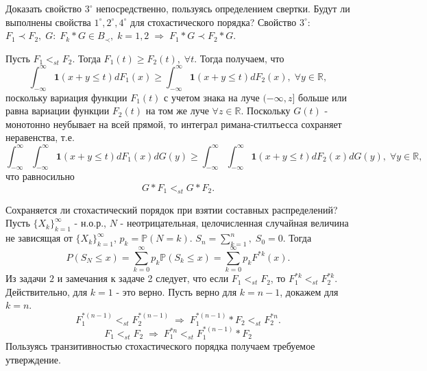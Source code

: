     \problem{}
        Доказать свойство $3^\circ$ непосредственно, пользуясь определением свертки. Будут ли выполнены свойства $1^\circ,2^\circ,4^\circ$ для стохастического порядка?
        \solution{}
            Свойство $3^\circ$: $F_1 \prec F_2, \; G: \; F_k*G \in B_{\prec},\; k=1,2 \; \Rightarrow \; F_1*G \prec F_2*G $.
                
            Пусть $F_1 <_{st} F_2$. Тогда $F_1(t) \geq F_2(t), \; \forall t  $. Тогда получаем, что 
            \begin{equation*}
                \int_{-\infty}^{\infty} \textbf{1}(x+y\leq t) dF_1(x) \geq \int_{-\infty}^{\infty} \textbf{1}(x+y\leq t) dF_2(x) , \; \forall y \in \mathbb R,
            \end{equation*}
            поскольку вариация функции $F_1(t)$ с учетом знака на луче $(-\infty, z]$ больше или равна вариации функции $F_2(t)$ на том же луче $\forall z \in \mathbb R$.
            Поскольку $G(t)$ - монотонно неубывает на всей прямой, то интеграл римана-стилтьесса сохраняет неравенства, т.е. 
            \begin{equation*}
                \int_{-\infty}^{\infty}\int_{-\infty}^{\infty} \textbf{1}(x+y\leq t) dF_1(x)dG(y) \geq \int_{-\infty}^{\infty}\int_{-\infty}^{\infty} \textbf{1}(x+y\leq t) dF_2(x)dG(y) , \; \forall y \in \mathbb R,
            \end{equation*}
            что равносильно 
            \begin{equation*}
                G*F_1 <_{st} G*F_2.
            \end{equation*}
    
    \problem{}
        Сохраняется ли стохастический порядок при взятии составных распределений?
        \solution{}
        Пусть $\{X_k\}_{k=1}^\infty$ - н.о.р., $N$ - неотрицательная, целочисленная случайная величина не зависящая от $\{X_k\}_{k=1}^\infty$, $p_k = \mathbb P(N=k)$. $S_n = \sum_{k=1}^n ,\; S_0 = 0$. Тогда 
        \begin{equation*}
            P(S_N\leq x) = \sum_{k=0}^\infty p_k\mathbb P(S_k \leq x) = \sum_{k=0}^\infty p_kF^{*k}(x).
        \end{equation*}
        Из задачи $2$ и замечания к задаче 2 следует, что если $F_1 <_{st}F_2$, то $F_1^{*k} <_{st} F_2^{*k}$. Действительно, для $k=1$ - это верно. Пусть верно для $k=n-1$, докажем для $k=n$. 
        \begin{equation*}
           F_1^{*(n-1)}<_{st} F_2^{*(n-1)} \; \Longrightarrow \; F_1^{*(n-1)}*F_2 <_{st} F_2^{*n}.
        \end{equation*}
        \begin{equation*}
            F_1<_{st} F_2 \; \Longrightarrow \; F_1^{*n} <_{st} F_1^{*(n-1)}*F_2
        \end{equation*}
        Пользуясь транзитивностью стохастического порядка получаем требуемое утверждение.
        
